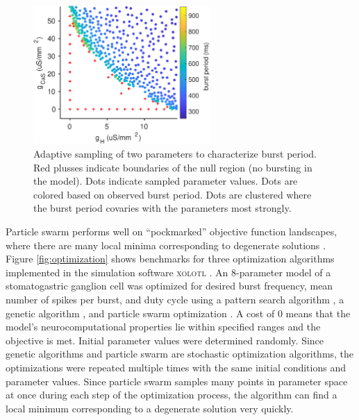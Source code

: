 \documentclass[a4paper,10pt]{article} %
\begin{document}
\begin{figure}
  \centering
  \includegraphics[width=0.6\textwidth]{gfx/demo_adaptive_sampling.eps}
  \caption{Adaptive sampling of two parameters to characterize burst period.
  Red plusses indicate boundaries of the null region (no bursting in the model).
  Dots indicate sampled parameter values. Dots are colored based on observed burst period.
  Dots are clustered where the burst period covaries with the parameters most strongly.}
  \label{fig:sampling}
\end{figure}

\FloatBarrier

Particle swarm performs well on ``pockmarked'' objective function landscapes,
where there are many local minima corresponding to degenerate solutions
\parencite{coventryHierarchicalWinnertakeallParticle2017, hoylandDifferentialResponsesNeuromodulation2018}.
Figure \ref{fig:optimization} shows benchmarks for three optimization algorithms
implemented in the simulation software \textsc{xolotl} \parencite{gorur-shandilyaXolotlIntuitiveApproachable2018}.
An 8-parameter model of a stomatogastric ganglion cell \parencite{prinzAlternativeHandtuningConductancebased2003}
was optimized for desired burst frequency, mean number of spikes per burst, and duty cycle
using a pattern search algorithm \parencite{hookeDirectSearchSolution1961},
a genetic algorithm \parencite{mitchellIntroductionGeneticAlgorithms2001},
and particle swarm optimization \parencite{kennedyParticleSwarmOptimization1995}.
A cost of 0 means that the model's neurocomputational properties lie within specified ranges
and the objective is met.
Initial parameter values were determined randomly.
Since genetic algorithms and particle swarm are stochastic optimization algorithms,
the optimizations were repeated multiple times with the same initial conditions and parameter values.
Since particle swarm samples many points in parameter space at once
during each step of the optimization process,
the algorithm can find a local minimum corresponding to a degenerate solution very quickly.
\end{document}
